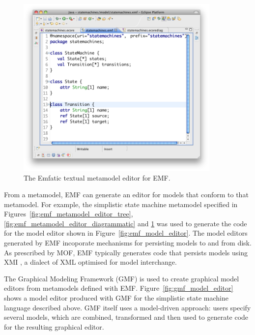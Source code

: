 \begin{figure}[htbp]
  \begin{center}
    \leavevmode
    \includegraphics[width=10cm]{2.Background/images/emf_metamodel_textual.png}
  \end{center}
  \caption{The Emfatic textual metamodel editor for EMF.}
  \label{fig:emf_metamodel_editor_textual}
\end{figure}

From a metamodel, EMF can generate an editor for models that conform to that metamodel. For example, the simplistic state machine metamodel specified in Figures~\ref{fig:emf_metamodel_editor_tree}, \ref{fig:emf_metamodel_editor_diagrammatic} and \ref{fig:emf_metamodel_editor_textual} was used to generate the code for the model editor shown in Figure~\ref{fig:emf_model_editor}. The model editors generated by EMF incoporate mechanisms for persisting models to and from disk. As prescribed by MOF, EMF typically generates code that persists models using XMI \cite{xmi}, a dialect of XML optimised for model interchange.

The Graphical Modeling Framework (GMF) \cite{gronback09emp} is used to create graphical model editors from metamodels defined with EMF. Figure~\ref{fig:gmf_model_editor} shows a model editor produced with GMF for the simplistic state machine language described above. GMF itself uses a model-driven approach: users specify several models, which are combined, transformed and then used to generate code for the resulting graphical editor. 

